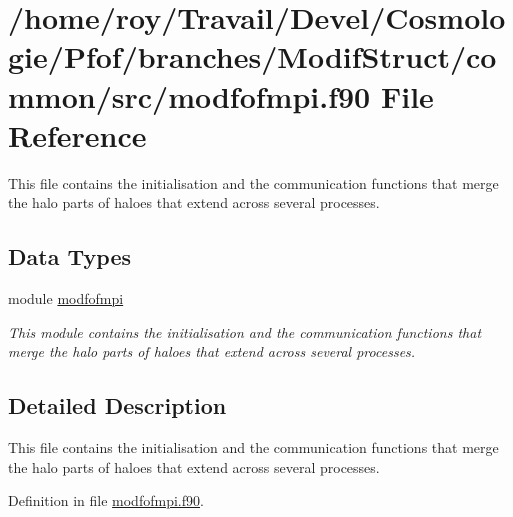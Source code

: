 \hypertarget{modfofmpi_8f90}{\section{/home/roy/\-Travail/\-Devel/\-Cosmologie/\-Pfof/branches/\-Modif\-Struct/common/src/modfofmpi.f90 File Reference}
\label{modfofmpi_8f90}
}


This file contains the initialisation and the communication functions that merge the halo parts of haloes that extend across several processes.  


\subsection*{Data Types}
\begin{DoxyCompactItemize}
\item 
module \hyperlink{classmodfofmpi}{modfofmpi}
\begin{DoxyCompactList}\small\item\em This module contains the initialisation and the communication functions that merge the halo parts of haloes that extend across several processes. \end{DoxyCompactList}\end{DoxyCompactItemize}


\subsection{Detailed Description}
This file contains the initialisation and the communication functions that merge the halo parts of haloes that extend across several processes. 

Definition in file \hyperlink{modfofmpi_8f90_source}{modfofmpi.\-f90}.

